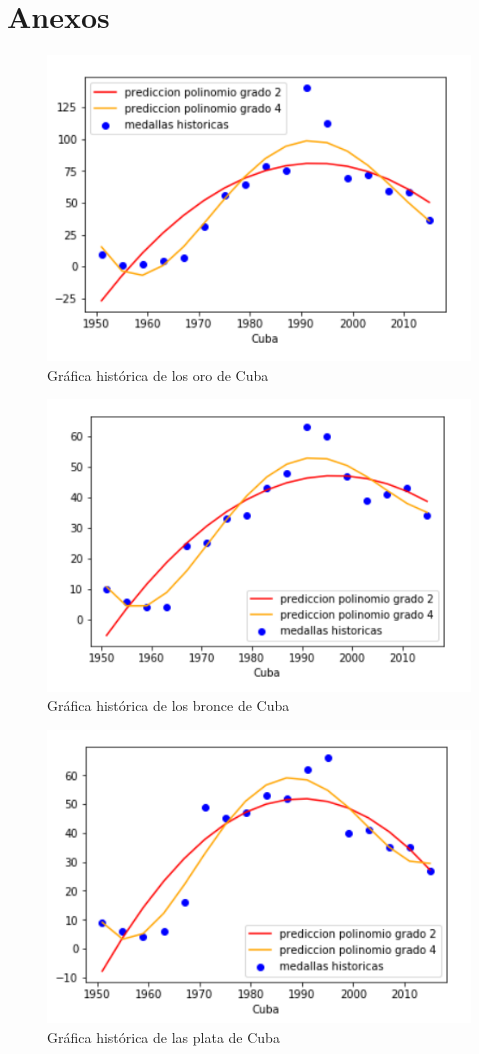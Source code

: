 \documentclass[a4paper,12pt]{article}
\begin{document}
\section{Anexos}
\begin{figure}[hbtp]
\caption{Gr\'{a}fica hist\'{o}rica de los oro de Cuba}
\centering
\includegraphics[scale=1]{cuba_oro.png}
\end{figure}
\begin{figure}[hbtp]
\caption{Gr\'{a}fica hist\'{o}rica de los bronce de Cuba}
\centering
\includegraphics[scale=1]{cuba_bronce.png}
\end{figure}
\begin{figure}[hbtp]
\caption{Gr\'{a}fica hist\'{o}rica de las plata de Cuba}
\centering
\includegraphics[scale=1]{cuba_plata.png}
\end{figure}
\end{document}
